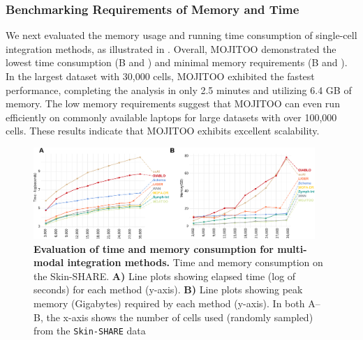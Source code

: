 \subsubsection{Benchmarking Requirements of Memory and Time}
We next evaluated the memory usage and running time consumption of single-cell integration methods, as illustrated in . Overall, MOJITOO demonstrated the lowest time consumption (B and ) and minimal memory requirements (B and ). In the largest dataset with 30,000 cells, MOJITOO exhibited the fastest performance, completing the analysis in only 2.5 minutes and utilizing 6.4 GB of memory. The low memory requirements suggest that MOJITOO can even run efficiently on commonly available laptops for large datasets with over 100,000 cells. These results indicate that MOJITOO exhibits excellent scalability.
\begin{figure}[!ht]
	\centering
	\includegraphics[width=0.95\textwidth]{time_memory/fig}
	\vspace{0.1cm}
	\caption[Evaluation of time and memory consumption for multi-modal integration methods.]{\textbf{Evaluation of time and memory consumption for multi-modal integration methods.} Time and memory consumption on the Skin-SHARE. \textbf{A)} Line plots showing elapsed time (log of seconds) for each method (y-axis). \textbf{B)} Line plots showing peak memory (Gigabytes) required by each method (y-axis). In both A–B, the x-axis shows the number of cells used (randomly sampled) from the \texttt{Skin-SHARE} data}
	\label{fig:time_memory}
\end{figure}

